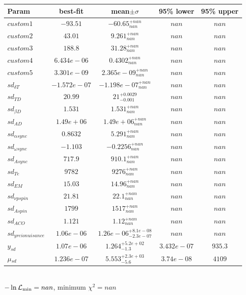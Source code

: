\begin{tabular}{|l|c|c|c|c|} 
 \hline 
Param & best-fit & mean$\pm\sigma$ & 95\% lower & 95\% upper \\ \hline 
$custom1$ &$-93.51$ & $-60.65_{nan}^{+nan}$ & $nan$ & $nan$ \\ 
$custom2$ &$43.01$ & $9.261_{nan}^{+nan}$ & $nan$ & $nan$ \\ 
$custom3$ &$188.8$ & $31.28_{nan}^{+nan}$ & $nan$ & $nan$ \\ 
$custom4$ &$6.434e-06$ & $0.4302_{nan}^{+nan}$ & $nan$ & $nan$ \\ 
$custom5$ &$3.301e-09$ & $2.365e-09_{nan}^{+nan}$ & $nan$ & $nan$ \\ 
$sd_{\delta{} T }$ &$-1.572e-07$ & $-1.198e-07_{nan}^{+nan}$ & $nan$ & $nan$ \\ 
$sd_{T D }$ &$20.99$ & $21_{-0.001}^{+0.0029}$ & $nan$ & $nan$ \\ 
$sd_{\beta{} D }$ &$1.531$ & $1.531_{nan}^{+nan}$ & $nan$ & $nan$ \\ 
$sd_{A D }$ &$1.49e+06$ & $1.49e+06_{nan}^{+nan}$ & $nan$ & $nan$ \\ 
$sd_{\alpha{} sync }$ &$0.8632$ & $5.291_{nan}^{+nan}$ & $nan$ & $nan$ \\ 
$sd_{\omega{} sync }$ &$-1.103$ & $-0.2256_{nan}^{+nan}$ & $nan$ & $nan$ \\ 
$sd_{A sync }$ &$717.9$ & $910.1_{nan}^{+nan}$ & $nan$ & $nan$ \\ 
$sd_{T e }$ &$9782$ & $9276_{nan}^{+nan}$ & $nan$ & $nan$ \\ 
$sd_{EM }$ &$15.03$ & $14.96_{nan}^{+nan}$ & $nan$ & $nan$ \\ 
$sd_{\nu{} p spin }$ &$21.81$ & $22.1_{nan}^{+nan}$ & $nan$ & $nan$ \\ 
$sd_{A spin }$ &$1799$ & $1517_{nan}^{+nan}$ & $nan$ & $nan$ \\ 
$sd_{A CO }$ &$1.121$ & $1.12_{nan}^{+nan}$ & $nan$ & $nan$ \\ 
$sd_{y reio nuisance }$ &$1.06e-06$ & $1.26e-06_{-2.3e-07}^{+8.1e-08}$ & $nan$ & $nan$ \\ 
$y_{sd }$ &$1.07e-06$ & $1.264_{-1.3}^{+5.2e+02}$ & $3.432e-07$ & $935.3$ \\ 
$\mu{}_{sd }$ &$1.236e-07$ & $5.553_{-5.6}^{+2.3e+03}$ & $3.74e-08$ & $4109$ \\ 
\hline 
 \end{tabular} \\ 
$-\ln{\cal L}_\mathrm{min} =nan$, minimum $\chi^2=nan$ \\ 
